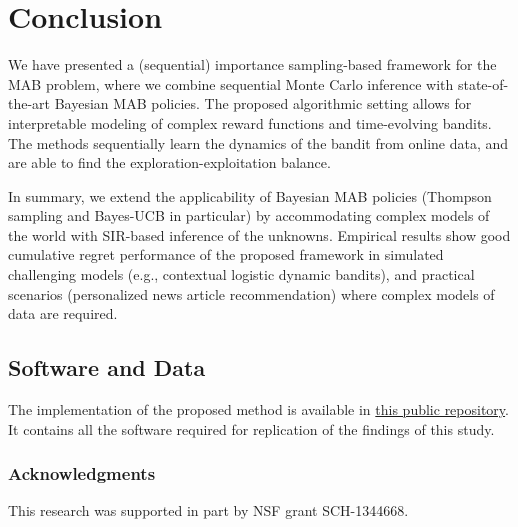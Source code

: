 \documentclass{article}
\newcommand{\eg}{e.g., }
\def\addappendix{}
\begin{document}
\clearpage
\section{Conclusion}
\label{sec:conclusion}

We have presented a (sequential) importance sampling-based framework for the MAB problem, where we combine sequential Monte Carlo inference with state-of-the-art Bayesian MAB policies. The proposed algorithmic setting allows for interpretable modeling of complex reward functions and time-evolving bandits. The methods sequentially learn the dynamics of the bandit from online data, and are able to find the exploration-exploitation balance.

In summary, we extend the applicability of Bayesian MAB policies (Thompson sampling and Bayes-UCB in particular) by accommodating complex models of the world with SIR-based inference of the unknowns. Empirical results show good cumulative regret performance of the proposed framework in simulated challenging models (\eg contextual logistic dynamic bandits), and practical scenarios (personalized news article recommendation) where complex models of data are required.

\subsection{Software and Data}
The implementation of the proposed method is available in \href{https://github.com/iurteaga/bandits}{this public repository}. It contains all the software required for replication of the findings of this study.

\subsubsection*{Acknowledgments}
This research was supported in part by NSF grant SCH-1344668.




\ifx\addappendix\undefined 
\end{document}
